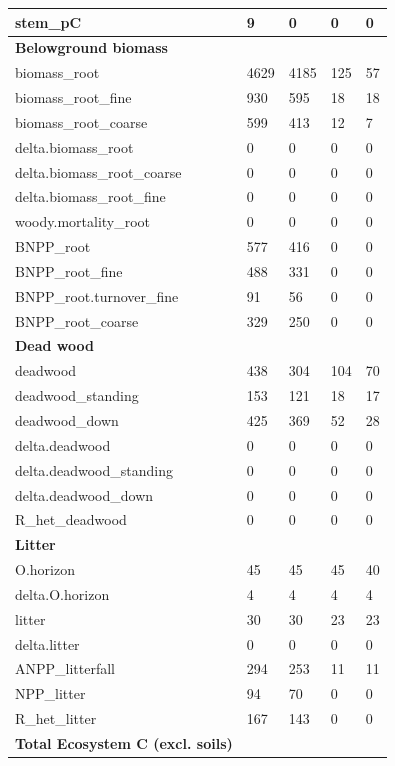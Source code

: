 \documentclass[, manuscript]{copernicus}
\begin{document}
\begin{longtable}[t]{l|l|l|l|l}
stem\_pC & 9 & 0 & 0 & 0\\
\hline
\textbf{Belowground biomass} & \textbf{} & \textbf{} & \textbf{} & \textbf{}\\
\hline
biomass\_root & 4629 & 4185 & 125 & 57\\
\hline
biomass\_root\_fine & 930 & 595 & 18 & 18\\
\hline
biomass\_root\_coarse & 599 & 413 & 12 & 7\\
\hline
delta.biomass\_root & 0 & 0 & 0 & 0\\
\hline
delta.biomass\_root\_coarse & 0 & 0 & 0 & 0\\
\hline
delta.biomass\_root\_fine & 0 & 0 & 0 & 0\\
\hline
woody.mortality\_root & 0 & 0 & 0 & 0\\
\hline
BNPP\_root & 577 & 416 & 0 & 0\\
\hline
BNPP\_root\_fine & 488 & 331 & 0 & 0\\
\hline
BNPP\_root.turnover\_fine & 91 & 56 & 0 & 0\\
\hline
BNPP\_root\_coarse & 329 & 250 & 0 & 0\\
\hline
\textbf{Dead wood} & \textbf{} & \textbf{} & \textbf{} & \textbf{}\\
\hline
deadwood & 438 & 304 & 104 & 70\\
\hline
deadwood\_standing & 153 & 121 & 18 & 17\\
\hline
deadwood\_down & 425 & 369 & 52 & 28\\
\hline
delta.deadwood & 0 & 0 & 0 & 0\\
\hline
delta.deadwood\_standing & 0 & 0 & 0 & 0\\
\hline
delta.deadwood\_down & 0 & 0 & 0 & 0\\
\hline
R\_het\_deadwood & 0 & 0 & 0 & 0\\
\hline
\textbf{Litter} & \textbf{} & \textbf{} & \textbf{} & \textbf{}\\
\hline
O.horizon & 45 & 45 & 45 & 40\\
\hline
delta.O.horizon & 4 & 4 & 4 & 4\\
\hline
litter & 30 & 30 & 23 & 23\\
\hline
delta.litter & 0 & 0 & 0 & 0\\
\hline
ANPP\_litterfall & 294 & 253 & 11 & 11\\
\hline
NPP\_litter & 94 & 70 & 0 & 0\\
\hline
R\_het\_litter & 167 & 143 & 0 & 0\\
\hline
\textbf{Total Ecosystem C (excl. soils)} & \textbf{} & \textbf{} & \textbf{} & \textbf{}\\

\end{longtable}
\end{document}
